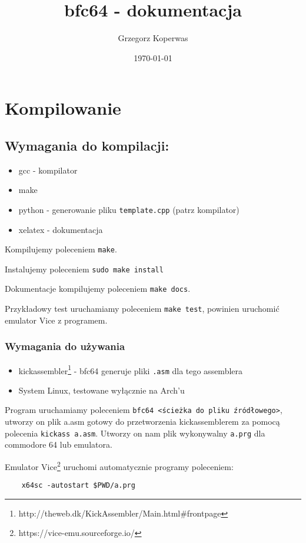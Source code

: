 \documentclass[a4paper,12pt]{article}
\title{bfc64 - dokumentacja}
\author{Grzegorz Koperwas}
\date{\today}
\begin{document}
    \maketitle
    \thispagestyle{fancy}

    \section{Kompilowanie}

    \subsection*{Wymagania do kompilacji:}
    \begin{itemize}
        \item gcc - kompilator
        \item make
        \item python - generowanie pliku \texttt{template.cpp} (patrz kompilator)
        \item xelatex - dokumentacja
    \end{itemize}

    Kompilujemy poleceniem \texttt{make}.
    
    Instalujemy poleceniem \texttt{sudo make install}

    Dokumentacje kompilujemy poleceniem \texttt{make docs}.

    Przykładowy test uruchamiamy poleceniem \texttt{make test}, powinien uruchomić emulator Vice z programem.

    \subsubsection*{Wymagania do używania}

    \begin{itemize}
        \item kickassembler\footnote{http://theweb.dk/KickAssembler/Main.html\#frontpage} - bfc64 generuje pliki \texttt{.asm} dla tego assemblera
        \item System Linux, testowane wyłącznie na Arch'u
    \end{itemize}

    Program uruchamiamy poleceniem \texttt{bfc64 <ścieżka do pliku źródłowego>}, utworzy on plik a.asm gotowy do przetworzenia kickassemblerem za pomocą polecenia \texttt{kickass a.asm}. Utworzy on nam plik wykonywalny \texttt{a.prg} dla commodore 64 lub emulatora.

    Emulator Vice\footnote{https://vice-emu.sourceforge.io/} uruchomi automatycznie programy poleceniem:
    \begin{lstlisting}
    x64sc -autostart $PWD/a.prg
    \end{lstlisting}
\end{document}
